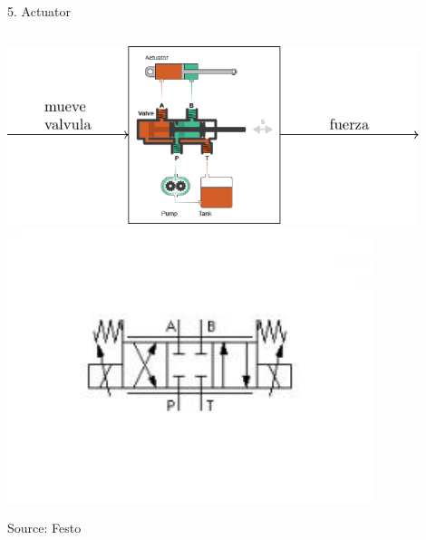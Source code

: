 \documentclass[presentation,aspectratio=169]{beamer}
\begin{document}
\begin{frame}[label={sec:org7b1b33a}]{5. Actuator}
\begin{columns}
\begin{column}{0.5\columnwidth}
\begin{center}
\includegraphics[width=0.9\textwidth]{../../figures/ac75-control-actuator-only}\\
\includegraphics[width=0.8\textwidth]{../../figures/43-valve-proportional.jpg}
\end{center}

{\footnotesize Source:  Festo}

\pause
\end{column}


\end{columns}
\end{frame}
\end{document}
